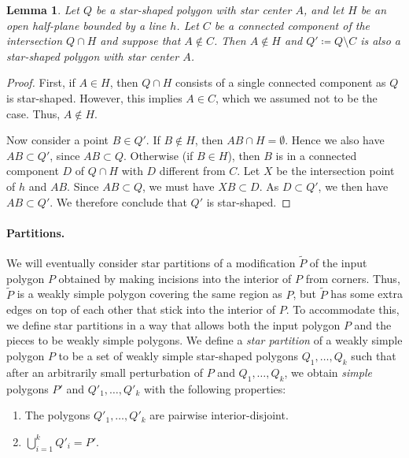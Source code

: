 \documentclass[10pt,a4paper]{article}
\newtheorem{lemma}{Lemma}[section]
\begin{document}
\begin{lemma}\label{lemma:cut}
Let $Q$ be a star-shaped polygon with star center $A$, and let $H$ be an open half-plane bounded by a line $h$.
Let $C$ be a connected component of the intersection $Q\cap H$ and suppose that $A\notin C$.
Then $A\notin H$ and $Q' \coloneqq Q\setminus C$ is also a star-shaped polygon with star center $A$.
\end{lemma}

\begin{proof}
First, if $A \in H$, then $Q\cap H$ consists of a single connected component as $Q$ is star-shaped. However, this implies $A \in C$, which we assumed not to be the case. Thus, $A \notin H$.

Now consider a point $B\in Q'$.
If $B\notin H$, then $AB\cap H=\emptyset$. Hence we also have $AB\subset Q'$, since $AB\subset Q$.
Otherwise (if $B \in H$), then $B$ is in a connected component $D$ of $Q\cap H$ with $D$ different from $C$.
Let $X$ be the intersection point of $h$ and $AB$.
Since $AB\subset Q$, we must have $XB\subset D$.
As $D\subset Q'$, we then have $AB\subset Q'$.
We therefore conclude that $Q'$ is star-shaped.
\end{proof}

\paragraph{Partitions.}
We will eventually consider star partitions of a modification $\tilde P$ of the input polygon $P$ obtained by making incisions into the interior of $P$ from corners.
Thus, $\tilde P$ is a weakly simple polygon covering the same region as $P$, but $\tilde P$ has some extra edges on top of each other that stick into the interior of $P$.
To accommodate this, we define star partitions in a way that allows both the input polygon $P$ and the pieces to be weakly simple polygons.
We define a \emph{star partition} of a weakly simple polygon $P$ to be a set of weakly simple star-shaped polygons $Q_1,\ldots,Q_k$ such that after an arbitrarily small perturbation of $P$ and $Q_1, \dots, Q_k$, we obtain \emph{simple} polygons $P'$ and $Q'_1,\ldots,Q'_k$ with the following properties:

\begin{enumerate}
    \item The polygons $Q'_1,\ldots,Q'_k$ are pairwise interior-disjoint. \label{partprop:1}
    
    \item $\bigcup_{i=1}^k Q'_i =P'$. \label{partprop:2}
\end{enumerate}
\end{document}
